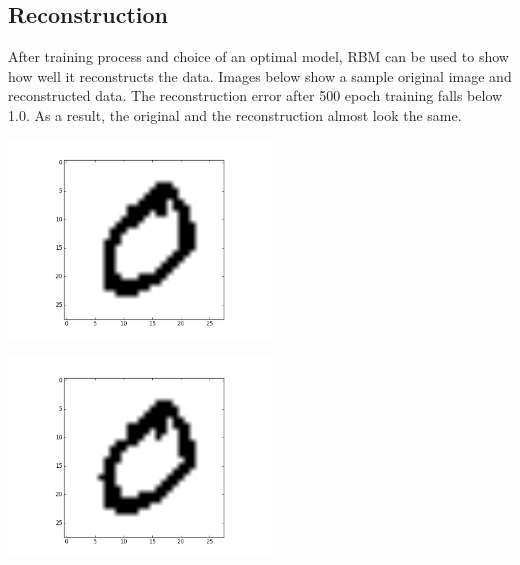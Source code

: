 \documentclass[a4paper]{scrartcl}
\begin{document}
\subsection{Reconstruction}
After training process and choice of an optimal model, RBM can be used to show how well it reconstructs the data. Images below show a sample original image and reconstructed data. The reconstruction error after 500 epoch training falls below 1.0. As a result, the original and the reconstruction almost look the same.
\par
\begin{minipage}[t]{0.5\textwidth}
\begin{center}
\includegraphics[width=7cm]{images/0original.png}
\end{center}
\end{minipage}
\begin{minipage}[t]{0.5\textwidth}
\begin{center}
\includegraphics[width=7cm]{images/0_reconstructed_momentum00.png}
\end{center}
\end{minipage}
\end{document}
